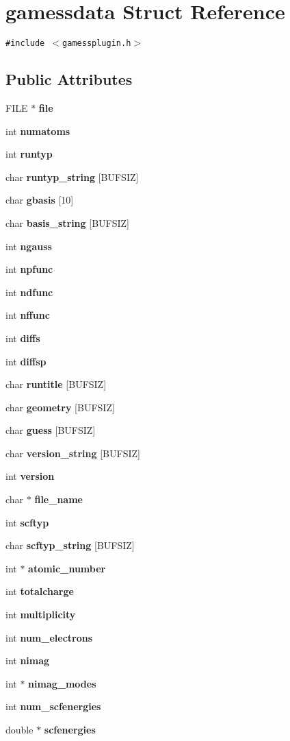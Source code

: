 \section{gamessdata  Struct Reference}
\label{structgamessdata}
{\tt \#include $<$gamessplugin.h$>$}

\subsection*{Public Attributes}
\begin{CompactItemize}
\item 
FILE $\ast$ {\bf file}
\item 
int {\bf numatoms}
\item 
int {\bf runtyp}
\item 
char {\bf runtyp\_\-string} [BUFSIZ]
\item 
char {\bf gbasis} [10]
\item 
char {\bf basis\_\-string} [BUFSIZ]
\item 
int {\bf ngauss}
\item 
int {\bf npfunc}
\item 
int {\bf ndfunc}
\item 
int {\bf nffunc}
\item 
int {\bf diffs}
\item 
int {\bf diffsp}
\item 
char {\bf runtitle} [BUFSIZ]
\item 
char {\bf geometry} [BUFSIZ]
\item 
char {\bf guess} [BUFSIZ]
\item 
char {\bf version\_\-string} [BUFSIZ]
\item 
int {\bf version}
\item 
char $\ast$ {\bf file\_\-name}
\item 
int {\bf scftyp}
\item 
char {\bf scftyp\_\-string} [BUFSIZ]
\item 
int $\ast$ {\bf atomic\_\-number}
\item 
int {\bf totalcharge}
\item 
int {\bf multiplicity}
\item 
int {\bf num\_\-electrons}
\item 
int {\bf nimag}
\item 
int $\ast$ {\bf nimag\_\-modes}
\item 
int {\bf num\_\-scfenergies}
\item 
double $\ast$ {\bf scfenergies}

\end{CompactItemize}
